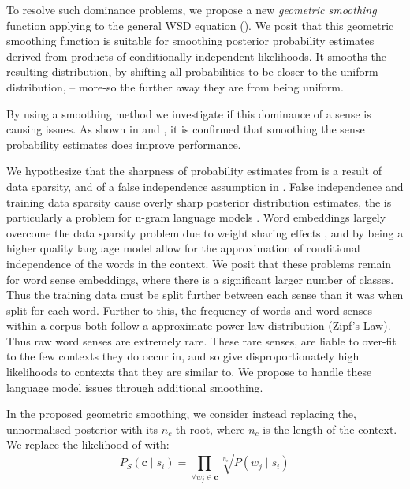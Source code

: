 \documentclass{sig-alternate}
\renewcommand{\c}{\mathbf{c}}
\begin{document}
To resolve such dominance problems, we propose a new \emph{geometric smoothing} function applying to the general WSD equation ().
We posit that this geometric smoothing function is suitable for smoothing posterior probability estimates derived from products of conditionally independent likelihoods.
It smooths the resulting distribution, by shifting all probabilities to be closer to the uniform distribution,  -- more-so the further away they are from being uniform.

By using a smoothing method we investigate if this dominance of a sense is causing issues.
As shown in  and , it is confirmed that smoothing the sense probability estimates does improve performance.


We hypothesize that the sharpness of probability estimates from  is a result of data sparsity, and of a false independence assumption in . False independence and training data sparsity cause overly sharp posterior distribution estimates, the is particularly a problem for n-gram language models \cite{rosenfeld2000two}.
Word  embeddings largely overcome the data sparsity problem due to weight sharing effects \parencite{NPLM},  and by being a higher quality language model allow for the approximation of conditional independence of the words in the context.
We posit that these problems remain for word sense embeddings, where there is a significant larger number of classes.
Thus the training data must be split further between each sense than it was when split for each word. 
Further to this, the frequency of words \parencite{zipf1949human}  and word senses \parencite{Kilgarriff2004} within a corpus both follow a approximate power law distribution (Zipf's Law).
Thus raw word senses are extremely rare.
These rare senses, are liable to over-fit to the few contexts they do occur in, and so give disproportionately high likelihoods to contexts that they are similar to.
We propose to handle these language model issues through additional smoothing.


In the proposed geometric smoothing, we consider instead replacing the, unnormalised posterior  with its $n_c$-th root, where $n_c$ is the length of the context.
We replace the likelihood of  with:
\begin{equation} \label{eq:contrextprobsmooth}
P_S(\c \mid s_{i})=\prod_{\forall w_{j}\in\c}\sqrt[n_c]{P(w_{j} \mid s_{i})}
\end{equation}
\end{document}
